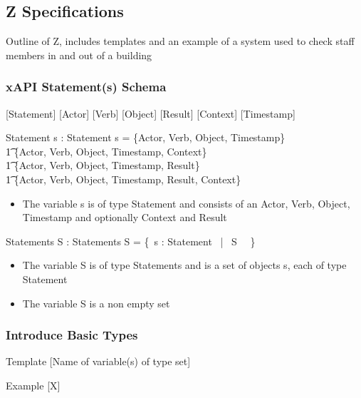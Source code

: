 \documentclass{article}
\begin{document}
\subsection{Z Specifications}
Outline of Z, includes templates and an example of a system used to check staff members in and out of a building
\subsubsection{xAPI Statement(s) Schema}
[Statement]
[Actor]
[Verb]
[Object]
[Result]
[Context]
[Timestamp]
\begin{schema}{Statement}
  s : Statement
  \where
  s = \{Actor, Verb, Object, Timestamp\} \, \lor
  \\ \t1 \{Actor, Verb, Object, Timestamp, Context\} \, \lor
  \\ \t1 \{Actor, Verb, Object, Timestamp, Result\} \, \lor
  \\ \t1 \{Actor, Verb, Object, Timestamp, Result, Context\}
\end{schema}
\begin{itemize}
\item The variable s is of type Statement and consists of an Actor, Verb, Object, Timestamp and optionally Context and Result
\end{itemize}
\begin{schema}{Statements}
  S : Statements
  \where
  S = \{~s : Statement \, | \, S \, \neg \, \emptyset\} \\
\end{schema}
\begin{itemize}
\item The variable S is of type Statements and is a set of objects s, each of type Statement
\item The variable S is a non empty set
\end{itemize}
\subsubsection{Introduce Basic Types}
\begin{paragraph}{Template}
  [Name of variable(s) of type set]
\end{paragraph}
\begin{paragraph}{Example}
  [X]
\end{paragraph}
\end{document}
